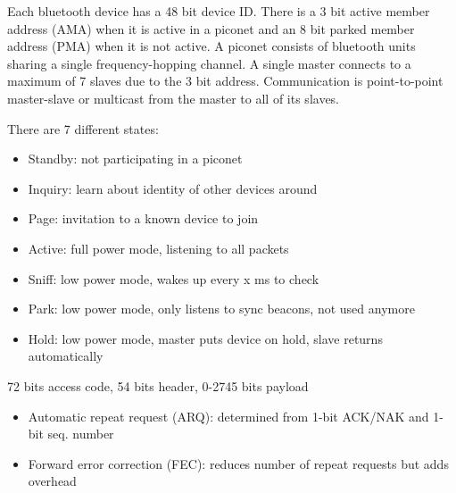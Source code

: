 \begin{mytitle}[Baseband]
    \begin{mysubtitle}[Addressing] Each bluetooth device has a 48 bit device ID. There is a 3 bit active member address (AMA) when it is active in a piconet and an 8 bit parked member address (PMA) when it is not active. A piconet consists of bluetooth units sharing a single frequency-hopping channel. A single master connects to a maximum of 7 slaves due to the 3 bit address. Communication is point-to-point master-slave or multicast from the master to all of its slaves.
    \end{mysubtitle}
    \begin{mysubtitle} There are 7 different states:
    \begin{itemize}
        \item Standby: not participating in a piconet
        \item Inquiry: learn about identity of other devices around
        \item Page: invitation to a known device to join
        \item Active: full power mode, listening to all packets
        \item Sniff: low power mode, wakes up every x ms to check
        \item Park: low power mode, only listens to sync beacons, not used anymore
        \item Hold: low power mode, master puts device on hold, slave returns automatically
    \end{itemize}
    \end{mysubtitle}
    \begin{mysubtitle} 72 bits access code, 54 bits header, 0-2745 bits payload
    \end{mysubtitle}
    \begin{mysubtitle}\hfill
    \begin{itemize}
        \item Automatic repeat request (ARQ): determined from 1-bit ACK/NAK and 1-bit seq. number
        \item Forward error correction (FEC): reduces number of repeat requests but adds overhead
    \end{itemize}
    \end{mysubtitle}
\end{mytitle}


